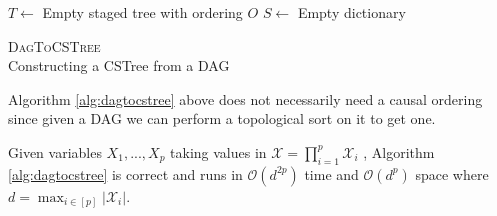 \documentclass{tufte-book}
\begin{document}
\begin{algorithm}[H]
\label{alg:dagtocstree}
      \SetAlgoLined
      $T \leftarrow$ Empty staged tree with ordering $O$\;
      $S \leftarrow$ Empty dictionary\;
       \caption{\textsc{DagToCSTree}\\Constructing a CSTree from a DAG}
      \end{algorithm}

Algorithm \ref{alg:dagtocstree} above does not necessarily need a causal ordering since given a DAG we can perform a topological sort on it to get one.

\begin{theorem}\label{thm:dagtocstreecorrectness}
Given variables $X_1,...,X_p$ taking values in $\mathcal{X}=\prod_{i=1}^p \mathcal{X}_i$ , Algorithm \ref{alg:dagtocstree} is correct and runs in $\mathcal{O}(d^{2p})$ time and $\mathcal{O}(d^p)$ space where $d = \max_{i \in [p]} |\mathcal{X}_i|$.
\end{theorem}
\end{document}

